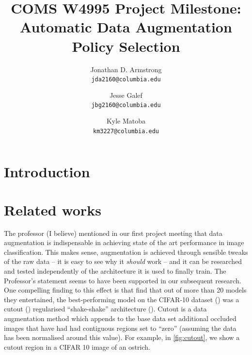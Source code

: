 \documentclass[10pt,twocolumn,letterpaper]{article}
\begin{document}
\title{COMS W4995 Project Milestone: Automatic Data Augmentation Policy Selection}

\author{Jonathan D. Armstrong\\
{\tt\small jda2160@columbia.edu}
\and
Jesse Galef\\
{\tt\small jbg2160@columbia.edu}
\and
Kyle Matoba\\
{\tt\small km3227@columbia.edu}
}

\maketitle


 
\section{Introduction}


\section{Related works}
The professor (I believe) mentioned in our first project meeting that data augmentation is indispensable in achieving state of the art performance in image classification. This makes sense, augmentation is achieved through sensible tweaks of the raw data -- it is easy to see why it \emph{should} work -- and it can be researched and tested independently of the architecture it is used to finally train. The Professor's statement seems to have been supported in our subsequent research. One compelling finding to this effect is that \cite{Recht2018} find that out of more than 20 models they entertained, the best-performing model on the CIFAR-10 dataset (\cite{Krizhevsk2009}) was a cutout (\cite{Devries2017}) regularised ``shake-shake'' architecture (\cite{Gastaldi2017}). Cutout is a data augmentation method which appends to the base data set additional occluded images that have had had contiguous regions set to ``zero'' (assuming the data has been normalised around this value). For example, in \autoref{fig:cutout}, we show a cutout region in a CIFAR 10 image of an ostrich.
\end{document}

